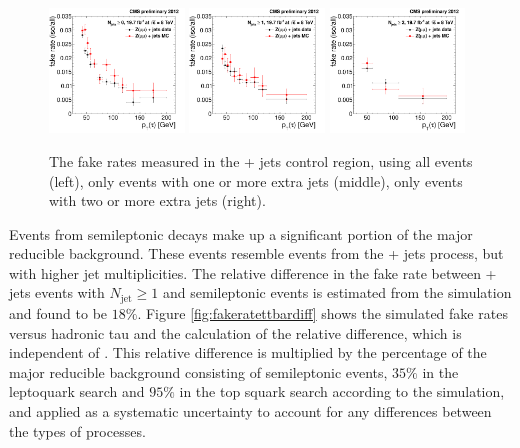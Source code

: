 \begin{figure}[hbt]
  \begin{center}
    \includegraphics[width=0.32\textwidth]{figures/bkgEstim/tfr_dmc.pdf}
    \includegraphics[width=0.32\textwidth]{figures/bkgEstim/tfr_dmc_1jet.pdf}
    \includegraphics[width=0.32\textwidth]{figures/bkgEstim/tfr_dmc_2jet.pdf}
    \caption{The fake rates measured in the \Zmm + jets control region, using all events (left), only events with one or more extra jets (middle), only events with two or more extra jets (right). \label{Bkg:fig:fakerate}}
  \end{center}
\end{figure}

Events from semileptonic \ttbar decays make up a significant portion of the major reducible background. These events resemble events from the \W + jets process, but with higher jet multiplicities. The relative difference in the fake rate between \Zmm + jets events with $N_{\text{jet}} \geq 1$ and semileptonic \ttbar events is estimated from the simulation and found to be $18\%$. Figure \ref{fig:fakeratettbardiff} shows the simulated fake rates versus hadronic tau \pt and the calculation of the relative difference, which is independent of \pt. This relative difference is multiplied by the percentage of the major reducible background consisting of semileptonic \ttbar events, $35\%$ in the leptoquark search and $95\%$ in the top squark search according to the simulation, and applied as a systematic uncertainty to account for any differences between the types of processes.

